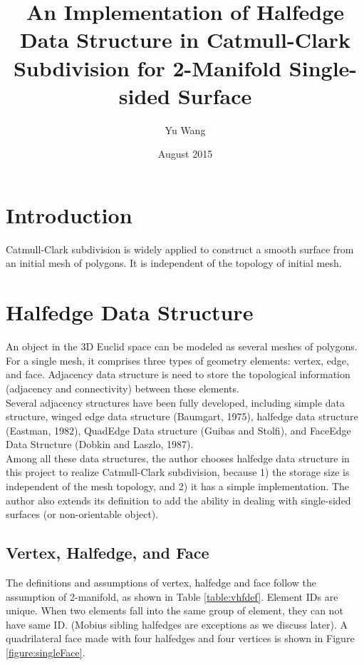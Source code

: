 \documentclass[12pt]{article}
\title{An Implementation of Halfedge Data Structure in Catmull-Clark 
Subdivision for 2-Manifold Single-sided Surface}
\author{Yu Wang}
\date{August 2015}
\begin{document}
\maketitle
\newpage

\tableofcontents

\section{Introduction}
Catmull-Clark subdivision is widely applied to construct a smooth surface from an initial mesh of polygons. It is independent of the topology of initial mesh.
\section{Halfedge Data Structure} \label{sec:halfedge}

An object in the 3D Euclid space can be modeled as several meshes of polygons. For a single mesh, it comprises three types of geometry elements: vertex, edge, and face. Adjacency data structure is need to store the topological information (adjacency and connectivity) between these elements.\\
Several adjacency structures have been fully developed, including simple data structure, winged edge data structure (Baumgart, 1975), halfedge data structure (Eastman, 1982), QuadEdge Data structure (Guibas and Stolfi), and FaceEdge Data Structure (Dobkin and Laszlo, 1987).\\
Among all these data structures, the author chooses halfedge data structure in this project to realize Catmull-Clark subdivision, because 1) the storage size is independent of the mesh topology, and 2) it has a simple implementation. The author also extends its definition to add the ability in dealing with single-sided surfaces (or non-orientable object).

\subsection{Vertex, Halfedge, and Face}

The definitions and assumptions of vertex, halfedge and face follow the assumption of 2-manifold, as shown in Table \ref{table:vhfdef}. Element IDs are unique. When two elements fall into the same group of element, they can not have same ID. (Mobius sibling halfedges are exceptions as we discuss later). A quadrilateral face made with four halfedges and four vertices is shown in Figure \ref{figure:singleFace}.
\end{document}
